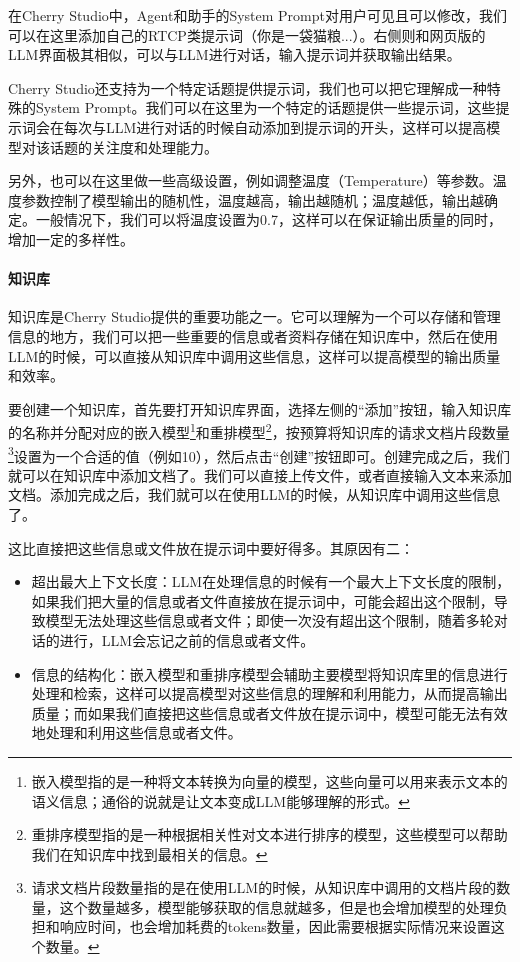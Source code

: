 在Cherry Studio中，Agent和助手的System Prompt对用户可见且可以修改，我们可以在这里添加自己的RTCP类提示词（你是一袋猫粮...）。右侧则和网页版的LLM界面极其相似，可以与LLM进行对话，输入提示词并获取输出结果。

Cherry Studio还支持为一个特定话题提供提示词，我们也可以把它理解成一种特殊的System Prompt。我们可以在这里为一个特定的话题提供一些提示词，这些提示词会在每次与LLM进行对话的时候自动添加到提示词的开头，这样可以提高模型对该话题的关注度和处理能力。

另外，也可以在这里做一些高级设置，例如调整温度（Temperature）等参数。温度参数控制了模型输出的随机性，温度越高，输出越随机；温度越低，输出越确定。一般情况下，我们可以将温度设置为0.7，这样可以在保证输出质量的同时，增加一定的多样性。

\paragraph{知识库}

知识库是Cherry Studio提供的重要功能之一。它可以理解为一个可以存储和管理信息的地方，我们可以把一些重要的信息或者资料存储在知识库中，然后在使用LLM的时候，可以直接从知识库中调用这些信息，这样可以提高模型的输出质量和效率。

要创建一个知识库，首先要打开知识库界面，选择左侧的“添加”按钮，输入知识库的名称并分配对应的嵌入模型\footnote{嵌入模型指的是一种将文本转换为向量的模型，这些向量可以用来表示文本的语义信息；通俗的说就是让文本变成LLM能够理解的形式。}和重排模型\footnote{重排序模型指的是一种根据相关性对文本进行排序的模型，这些模型可以帮助我们在知识库中找到最相关的信息。}，按预算将知识库的请求文档片段数量\footnote{请求文档片段数量指的是在使用LLM的时候，从知识库中调用的文档片段的数量，这个数量越多，模型能够获取的信息就越多，但是也会增加模型的处理负担和响应时间，也会增加耗费的tokens数量，因此需要根据实际情况来设置这个数量。}设置为一个合适的值（例如10），然后点击“创建”按钮即可。创建完成之后，我们就可以在知识库中添加文档了。我们可以直接上传文件，或者直接输入文本来添加文档。添加完成之后，我们就可以在使用LLM的时候，从知识库中调用这些信息了。

这比直接把这些信息或文件放在提示词中要好得多。其原因有二：
\begin{itemize}
  \item 超出最大上下文长度：LLM在处理信息的时候有一个最大上下文长度的限制，如果我们把大量的信息或者文件直接放在提示词中，可能会超出这个限制，导致模型无法处理这些信息或者文件；即使一次没有超出这个限制，随着多轮对话的进行，LLM会忘记之前的信息或者文件。
  \item 信息的结构化：嵌入模型和重排序模型会辅助主要模型将知识库里的信息进行处理和检索，这样可以提高模型对这些信息的理解和利用能力，从而提高输出质量；而如果我们直接把这些信息或者文件放在提示词中，模型可能无法有效地处理和利用这些信息或者文件。
\end{itemize}

